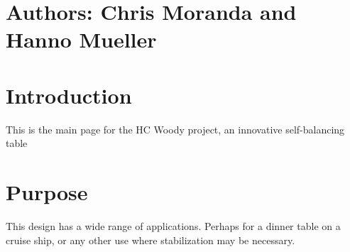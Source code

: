 \hypertarget{index_authors}{}\section{Authors\+: Chris Moranda and Hanno Mueller}\label{index_authors}
\hypertarget{index_intro}{}\section{Introduction}\label{index_intro}
This is the main page for the HC Woody project, an innovative self-\/balancing table \hypertarget{index_purpose}{}\section{Purpose}\label{index_purpose}
This design has a wide range of applications. Perhaps for a dinner table on a cruise ship, or any other use where stabilization may be necessary. 